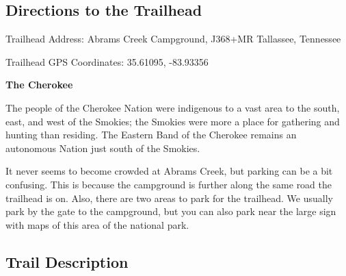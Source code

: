 \documentclass[
  letterpaper,
  DIV=11,
  numbers=noendperiod]{scrreprt}
\begin{document}
\subsection{Directions to the
Trailhead}\label{directions-to-the-trailhead-24}

Trailhead Address: Abrams Creek Campground, J368+MR Tallassee, Tennessee

Trailhead GPS Coordinates: 35.61095, -83.93356

\begin{tcolorbox}[enhanced jigsaw, opacityback=0, bottomrule=.15mm, colframe=quarto-callout-note-color-frame, breakable, arc=.35mm, leftrule=.75mm, rightrule=.15mm, toprule=.15mm, left=2mm, colback=white]
\begin{minipage}[t]{5.5mm}
\textcolor{quarto-callout-note-color}{\faInfo}
\end{minipage}%
\begin{minipage}[t]{\textwidth - 5.5mm}

\vspace{-3mm}\textbf{The Cherokee}\vspace{3mm}

The people of the Cherokee Nation were indigenous to a vast area to the
south, east, and west of the Smokies; the Smokies were more a place for
gathering and hunting than residing. The Eastern Band of the Cherokee
remains an autonomous Nation just south of the Smokies.

\end{minipage}%
\end{tcolorbox}

It never seems to become crowded at Abrams Creek, but parking can be a
bit confusing. This is because the campground is further along the same
road the trailhead is on. Also, there are two areas to park for the
trailhead. We usually park by the gate to the campground, but you can
also park near the large sign with maps of this area of the national
park.

\subsection{Trail Description}\label{trail-description-24}
\end{document}
